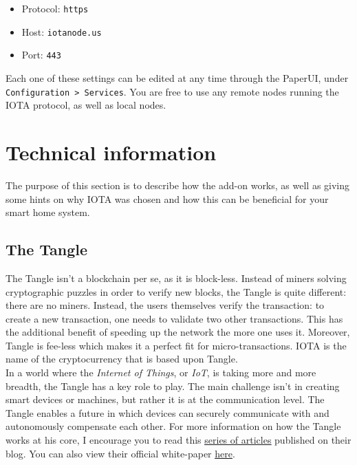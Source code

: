 \documentclass[a4paper,10pt]{article}
\begin{document}
\begin{itemize}
	\item Protocol: \texttt{https}
	\item Host: \texttt{iotanode.us}
	\item Port: \texttt{443}
\end{itemize} 

\bigskip

\noindent Each one of these settings can be edited at any time through the PaperUI, under \texttt{Configuration > Services}. You are free to use any remote nodes running the IOTA protocol, as well as local nodes. 

\section{Technical information}

The purpose of this section is to describe how the add-on works, as well as giving some hints on why IOTA was chosen and how this can be beneficial for your smart home system.

\subsection{The Tangle}

The Tangle isn’t a blockchain per se, as it is block-less. Instead of miners solving cryptographic puzzles in order to verify new blocks, the Tangle is quite different: there are no miners. Instead, the users themselves verify the transaction: to create a new transaction, one needs to validate two other transactions. This has the additional benefit of speeding up the network the more one uses it. Moreover, Tangle is fee-less which makes it a perfect fit for micro-transactions. IOTA is the name of the cryptocurrency that is based upon Tangle. \\

\noindent In a world where the \textit{Internet of Things}, or \textit{IoT}, is taking more and more breadth, the Tangle has a key role to play. The main challenge isn’t in creating smart devices or machines, but rather it is at the communication level. The Tangle enables a future in which devices can securely communicate with and autonomously compensate each other. For more information on how the Tangle works at his core, I encourage you to read this \textcolor{blue}{\underline{\href{https://blog.iota.org/the-tangle-an-illustrated-introduction-4d5eae6fe8d4}{series of articles}}} published on their blog. You can also view their official white-paper \textcolor{blue}{\underline{\href{http://iotatoken.com/IOTA_Whitepaper.pdf}{here}}}. 
\end{document}
